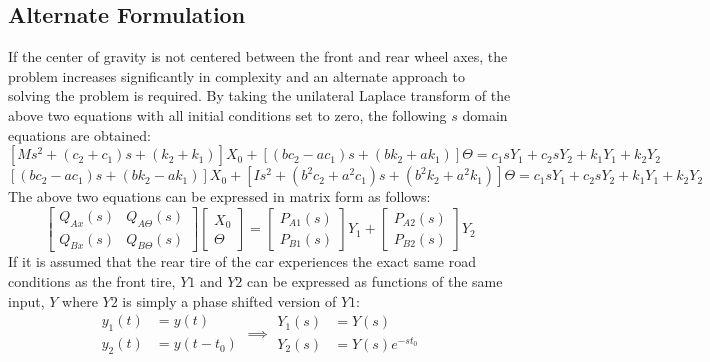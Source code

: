 \documentclass[12pt]{article}
\begin{document}
\subsection{Alternate Formulation}
If the center of gravity is not centered between the front and rear wheel axes, the problem increases significantly in complexity and an alternate approach to solving the problem is required. By taking the unilateral Laplace transform of the above two equations with all initial conditions set to zero, the following $s$ domain equations are obtained:
\begin{equation}
	\left[Ms^2+(c_2+c_1)s+(k_2+k_1)\right]X_0 + \left[(bc_2-ac_1)s+(bk_2+ak_1)\right]\Theta = c_1sY_1 + c_2sY_2 + k_1Y_1 + k_2Y_2
\end{equation}
\begin{equation}
	\left[(bc_2-ac_1)s+(bk_2-ak_1)\right]X_0 + \left[Is^2+ (b^2c_2+a^2c_1)s+(b^2k_2+a^2k_1)\right]\Theta = c_1sY_1 + c_2sY_2 + k_1Y_1 + k_2Y_2
\end{equation}
The above two equations can be expressed in matrix form as follows: 
\begin{equation}
	\label{eq:matrix1}
	\begin{bmatrix} 
	Q_{Ax}(s) & Q_{A\Theta}(s) \\
	Q_{Bx}(s) & Q_{B\Theta}(s)
	\end{bmatrix}
	\begin{bmatrix} 
	X_0 \\
	\Theta 
	\end{bmatrix}
	= 
	\begin{bmatrix} 
	P_{A1}(s) \\
	P_{B1}(s)
	\end{bmatrix}Y_1 +
	\begin{bmatrix} 
	P_{A2}(s) \\
	P_{B2}(s)
	\end{bmatrix}
	Y_2
\end{equation}
If it is assumed that the rear tire of the car experiences the exact same road conditions as the front tire, $Y1$ and $Y2$ can be expressed as functions of the same input, $Y$ where $Y2$ is simply a phase shifted version of $Y1$:
\begin{equation}
	\begin{split}
		y_1(t) &= y(t)\\
		y_2(t) &= y(t-t_0)
	\end{split} \implies
	\begin{split}
		Y_1(s) &= Y(s)\\
		Y_2(s) &= Y(s)e^{-st_0}
	\end{split}
\end{equation}
\end{document}
